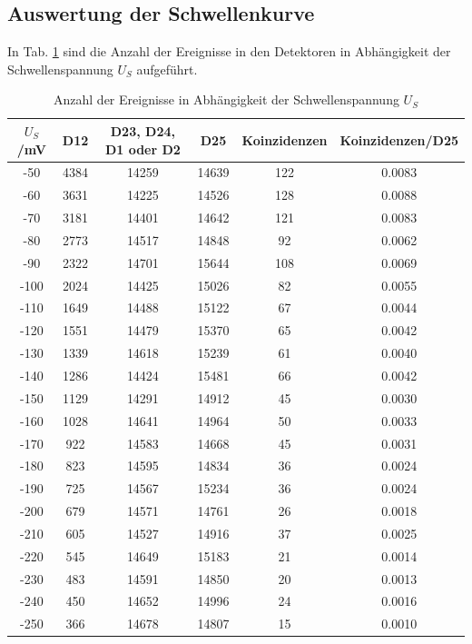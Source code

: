 \subsection{Auswertung der Schwellenkurve}
In Tab. \ref{tab:schwelle} sind die Anzahl der Ereignisse in den Detektoren in Abhängigkeit der Schwellenspannung $U_S$ aufgeführt. 

\begin{table}
\centering
\caption{Anzahl der Ereignisse in Abhängigkeit der Schwellenspannung $U_S$}
\label{tab:schwelle}
\begin{tabular}{cccccc}
\toprule
$U_S$/\si{\milli\volt}& D12 & D23, D24, D1 oder D2 & D25 & Koinzidenzen & Koinzidenzen/D25\\
\midrule
-50 & 4384 & 14259 & 14639 & 122 & 0.0083\\
-60 & 3631 & 14225 & 14526 & 128 & 0.0088\\
-70 & 3181 & 14401 & 14642 & 121 & 0.0083\\
-80 & 2773 & 14517 & 14848 & 92 & 0.0062\\
-90 & 2322 & 14701 & 15644 & 108 & 0.0069\\
-100 & 2024 & 14425 & 15026 & 82 & 0.0055\\
-110 & 1649 & 14488 & 15122 & 67 & 0.0044\\
-120 & 1551 & 14479 & 15370 & 65 & 0.0042\\
-130 & 1339 & 14618 & 15239 & 61 & 0.0040\\
-140 & 1286 & 14424 & 15481 & 66 & 0.0042\\
-150 & 1129 & 14291 & 14912 & 45 & 0.0030\\
-160 & 1028 & 14641 & 14964 & 50 & 0.0033\\
-170 & 922 & 14583 & 14668 & 45 & 0.0031\\
-180 & 823 & 14595 & 14834 & 36 & 0.0024\\
-190 & 725 & 14567 & 15234 & 36 & 0.0024\\
-200 & 679 & 14571 & 14761 & 26 & 0.0018\\
-210 & 605 & 14527 & 14916 & 37 & 0.0025\\
-220 & 545 & 14649 & 15183 & 21 & 0.0014\\
-230 & 483 & 14591 & 14850 & 20 & 0.0013\\
-240 & 450 & 14652 & 14996 & 24 & 0.0016\\
-250 & 366 & 14678 & 14807 & 15 & 0.0010\\
\bottomrule
\end{tabular}
\end{table}

